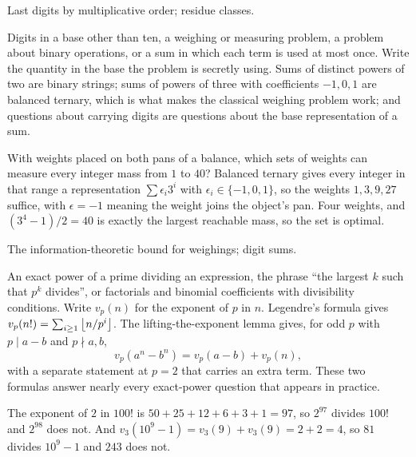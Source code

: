 \begin{seealsob}Last digits by multiplicative order; residue classes.\end{seealsob}

\cue Digits in a base other than ten, a weighing or measuring problem, a problem about binary operations, or a sum in which each term is used at most once.
\method Write the quantity in the base the problem is secretly using. Sums of distinct powers of two are binary strings; sums of powers of three with coefficients $-1,0,1$ are balanced ternary, which is what makes the classical weighing problem work; and questions about carrying digits are questions about the base representation of a sum.

\begin{worked}
With weights placed on both pans of a balance, which sets of weights can measure every integer mass from $1$ to $40$? Balanced ternary gives every integer in that range a representation $\sum \epsilon_{i}3^{i}$ with $\epsilon_{i}\in\{-1,0,1\}$, so the weights $1,3,9,27$ suffice, with $\epsilon=-1$ meaning the weight joins the object's pan. Four weights, and $\left(3^{4}-1\right)/2=40$ is exactly the largest reachable mass, so the set is optimal.
\end{worked}

\begin{seealsob}The information-theoretic bound for weighings; digit sums.\end{seealsob}

\cue An exact power of a prime dividing an expression, the phrase ``the largest $k$ such that $p^{k}$ divides'', or factorials and binomial coefficients with divisibility conditions.
\method Write $v_{p}(n)$ for the exponent of $p$ in $n$. Legendre's formula gives $v_{p}(n!)=\sum_{i\geq1}\left\lfloor n/p^{i}\right\rfloor$. The lifting-the-exponent lemma gives, for odd $p$ with $p\mid a-b$ and $p\nmid a,b$,
\[
v_{p}\!\left(a^{n}-b^{n}\right)=v_{p}(a-b)+v_{p}(n),
\]
with a separate statement at $p=2$ that carries an extra term. These two formulas answer nearly every exact-power question that appears in practice.

\begin{worked}
The exponent of $2$ in $100!$ is $50+25+12+6+3+1=97$, so $2^{97}$ divides $100!$ and $2^{98}$ does not. And $v_{3}(10^{9}-1)=v_{3}(9)+v_{3}(9)=2+2=4$, so $81$ divides $10^{9}-1$ and $243$ does not.
\end{worked}

